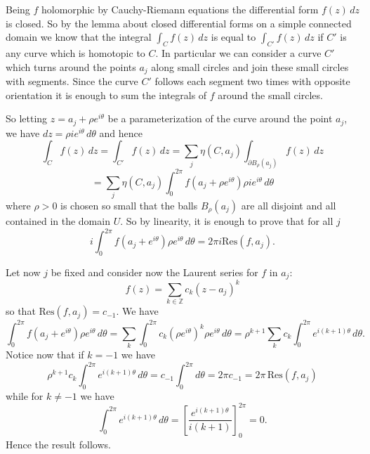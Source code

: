 \documentclass[12pt]{article}
\begin{document}
Being $f$ holomorphic by Cauchy-Riemann equations the differential form $f(z)\,dz$ is closed. So by the lemma about closed differential forms on a simple connected domain we know that the integral $\int_C f(z)\, dz$ is equal to $\int_{C'} f(z)\, dz$ if $C'$ is any curve which is homotopic to $C$. 
In particular we can consider a curve $C'$ which turns around the points $a_j$ along small circles and join these small circles with segments. Since the curve $C'$ follows each segment two times with opposite orientation it is enough to sum
the integrals of $f$ around the small circles.

So letting $z=a_j+\rho e^{i\theta}$ be a parameterization of the curve around the point $a_j$, we have $dz=\rho i e^{i\theta}\, d \theta$ and hence
\[
  \int_C f(z)\, dz = \int_{C'} f(z)\, dz = \sum_j \eta(C,a_j)\int_{\partial B_\rho(a_j)} f(z)\, dz
\]\[
 = \sum_j \eta(C,a_j) \int_0^{2\pi} f(a_j+\rho e^{i\theta}) \rho i e^{i\theta}\, d\theta
\]
where $\rho>0$ is chosen so small that the balls $B_\rho(a_j)$ are all disjoint and all contained in the domain $U$. So by linearity, it is enough to prove that
for all $j$
\[
   i\int_0^{2\pi} f(a_j+e^{i\theta})\rho e^{i\theta}\, d\theta = 2\pi i \mathrm{Res}(f,a_j).
\]

Let now $j$ be fixed and
consider now the Laurent series for $f$ in $a_j$:
\[
f(z)= \sum_{k\in \mathbb Z} c_k (z-a_j)^k
\]
so that $\mathrm{Res}(f,a_j)=c_{-1}$. We have
\[
  \int_0^{2\pi} f(a_j+e^{i\theta})\rho e^{i\theta}\, d\theta =
  \sum_k \int_0^{2\pi} c_k (\rho e^{i\theta})^k \rho e^{i\theta}\, d\theta
 =\rho^{k+1} \sum_k c_k \int_0^{2\pi}  e^{i(k+1)\theta}\, d\theta.
\]
Notice now that if $k=-1$ we have
\[
\rho^{k+1} c_k \int_0^{2\pi} e^{i(k+1)\theta}\, d\theta = 
c_{-1}\int_0^{2\pi} d\theta = 2\pi c_{-1} = 2\pi \,\mathrm{Res}(f,a_j)
\]
while for $k\neq -1$ we have
\[
  \int_0^{2\pi} e^{i(k+1)\theta}\, d\theta =  \left[\frac{e^{i(k+1)\theta}}{i(k+1)}\right]_0^{2\pi} = 0.
\]
Hence the result follows.
\end{document}
